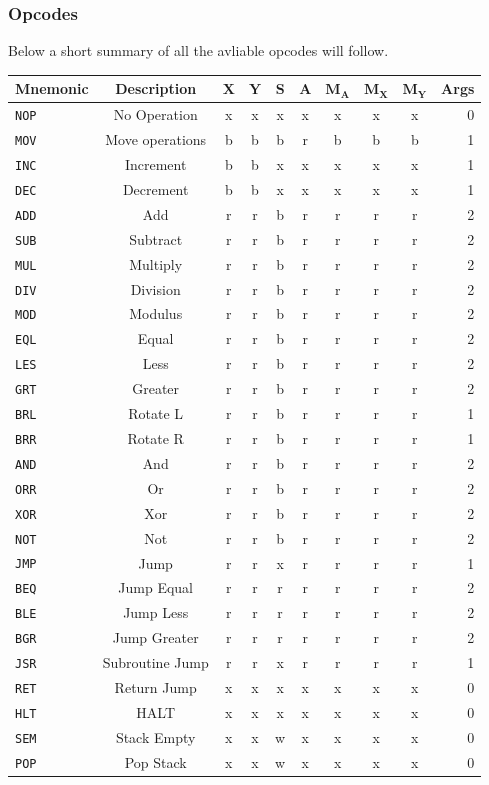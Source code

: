 \documentclass{article}
\newcommand{\V}{\verb}
\newcommand{\x}{$\textbf{X}$}
\newcommand{\y}{$\textbf{Y}$}
\newcommand{\s}{$\textbf{S}$}
\newcommand{\A}{$\textbf{A}$}
\newcommand{\mx}{$\textbf{M}_{\textbf{X}}$}
\newcommand{\my}{$\textbf{M}_{\textbf{Y}}$}
\newcommand{\ma}{$\textbf{M}_{\textbf{A}}$}
\begin{document}
\subsubsection{Opcodes}
Below a short summary of all the avliable opcodes will follow.\\
\begin{tabular}{l || c | *{7}{c|} | r}
\textbf{Mnemonic} & \textbf{Description} & \x & \y& \s & \A &\ma & \mx & \my &
Args
\\
\hline
\V+NOP+ & No Operation & x & x & x & x & x & x & x & 0  \\
\hline
\V+MOV+ & Move operations & b & b & b & r & b & b & b & 1 \\
\hline
\V+INC+ & Increment& b & b & x & x & x & x & x & 1 \\
\V+DEC+ & Decrement	& b & b & x & x & x & x & x & 1 \\
\V+ADD+ & Add		& r & r & b & r & r & r & r & 2 \\
\V+SUB+ & Subtract	& r & r & b & r & r & r & r & 2 \\
\V+MUL+ & Multiply	& r & r & b & r & r & r & r & 2 \\
\V+DIV+ & Division	& r & r & b & r & r & r & r & 2 \\
\V+MOD+ & Modulus	& r & r & b & r & r & r & r & 2 \\
\hline
\V+EQL+ & Equal		& r & r & b & r & r & r & r & 2 \\
\V+LES+ & Less		& r & r & b & r & r & r & r & 2 \\
\V+GRT+ & Greater 	& r & r & b & r & r & r & r & 2 \\
\V+BRL+ & Rotate L	& r & r & b & r & r & r & r & 1 \\
\V+BRR+ & Rotate R	& r & r & b & r & r & r & r & 1 \\
\V+AND+ & And		& r & r & b & r & r & r & r & 2 \\
\V+ORR+ & Or 		& r & r & b & r & r & r & r & 2 \\
\V+XOR+ & Xor		& r & r & b & r & r & r & r & 2 \\
\V+NOT+ & Not		& r & r & b & r & r & r & r & 2 \\
\hline
\V+JMP+ & Jump		& r & r & x & r & r & r & r & 1 \\
\V+BEQ+ & Jump Equal& r & r & r & r & r & r & r & 2 \\
\V+BLE+ & Jump Less	& r & r & r & r & r & r & r & 2 \\
\V+BGR+ & Jump Greater& r & r & r & r & r & r & r & 2 \\
\V+JSR+ & Subroutine Jump& r & r & x & r & r & r & r & 1 \\
\V+RET+ & Return Jump& x & x & x & x & x & x & x & 0 \\
\hline
\V+HLT+ & HALT& x & x & x & x & x & x & x & 0 \\
\V+SEM+ & Stack Empty& x & x & w & x & x & x & x & 0 \\
\V+POP+ & Pop Stack& x & x & w & x & x & x & x & 0 \\
\end{tabular}
\end{document}
